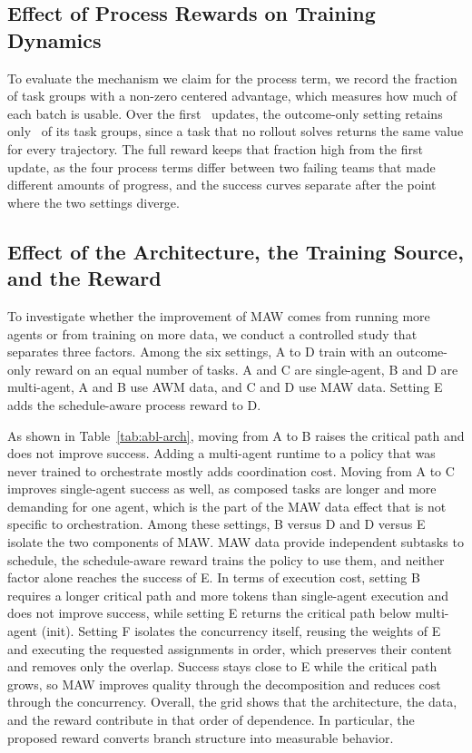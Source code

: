 \subsection{Effect of Process Rewards on Training Dynamics}
\label{sec:dynamics}

To evaluate the mechanism we claim for the process term, we record the fraction of task groups with a non-zero centered advantage, which measures how much of each batch is usable.
Over the first \fillin\ updates, the outcome-only setting retains only \fillin\ of its task groups, since a task that no rollout solves returns the same value for every trajectory.
The full reward keeps that fraction high from the first update, as the four process terms differ between two failing teams that made different amounts of progress, and the success curves separate after the point where the two settings diverge.

\subsection{Effect of the Architecture, the Training Source, and the Reward}
\label{sec:abl-arch}

To investigate whether the improvement of MAW comes from running more agents or from training on more data, we conduct a controlled study that separates three factors.
Among the six settings, A to D train with an outcome-only reward on an equal number of tasks.
A and C are single-agent, B and D are multi-agent, A and B use AWM data, and C and D use MAW data.
Setting E adds the schedule-aware process reward to D.



As shown in Table~\ref{tab:abl-arch}, moving from A to B raises the critical path and does not improve success.
Adding a multi-agent runtime to a policy that was never trained to orchestrate mostly adds coordination cost.
Moving from A to C improves single-agent success as well, as composed tasks are longer and more demanding for one agent, which is the part of the MAW data effect that is not specific to orchestration.
Among these settings, B versus D and D versus E isolate the two components of MAW.
MAW data provide independent subtasks to schedule, the schedule-aware reward trains the policy to use them, and neither factor alone reaches the success of E.
In terms of execution cost, setting B requires a longer critical path and more tokens than single-agent execution and does not improve success, while setting E returns the critical path below multi-agent (init).
Setting F isolates the concurrency itself, reusing the weights of E and executing the requested assignments in order, which preserves their content and removes only the overlap.
Success stays close to E while the critical path grows, so MAW improves quality through the decomposition and reduces cost through the concurrency.
Overall, the grid shows that the architecture, the data, and the reward contribute in that order of dependence.
In particular, the proposed reward converts branch structure into measurable behavior.

